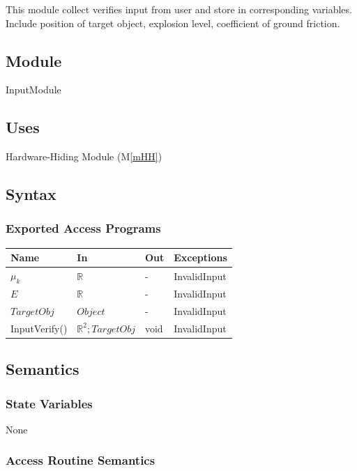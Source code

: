 \documentclass[12pt, titlepage]{article}
\newcommand{\mref}[1]{M\ref{#1}}
\begin{document}
This module collect verifies input from user and store in corresponding variables. Include position of target object, explosion level, coefficient of ground friction.

\subsection{Module}

InputModule

\subsection{Uses}

Hardware-Hiding Module (\mref{mHH})

\subsection{Syntax}



\subsubsection{Exported Access Programs}

\begin{center}
\begin{tabular}{p{2cm} p{4cm} p{4cm} p{2cm}}
\hline
\textbf{Name} & \textbf{In} & \textbf{Out} & \textbf{Exceptions} \\
\hline
$\mu_{k}$ &  $\mathbb{R}$ & - & InvalidInput\\
$E$ & $\mathbb{R}$ & - & InvalidInput\\
$TargetObj$ & $Object$ & - & InvalidInput\\
InputVerify() &  $\mathbb{R}^{2}; TargetObj$ & void & InvalidInput\\
\hline
\end{tabular}
\end{center}
\subsection{Semantics}

\subsubsection{State Variables}
None
\subsubsection{Access Routine Semantics}
\end{document}
